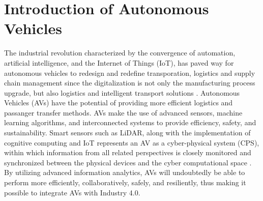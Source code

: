 \section{Introduction of Autonomous Vehicles}

The industrial revolution characterized by the convergence of automation, artificial intelligence, and the Internet of Things (IoT), has paved way for autonomous vehicles to redesign and redefine transporation, logistics and supply chain management since the digitalization is not only the manufacturing process upgrade, but also logistics and intelligent transport solutions \cite{ref1}. Autonomous Vehicles (AVs) have the potential of providing more efficient logistics and passanger transfer methods. AVs make the use of advanced sensors, machine learning algorithms, and interconnected systems to provide efficiency, safety, and sustainability. Smart sensors such as LiDAR, along with the implementation of cognitive computing and IoT represents an AV as a cyber-physical system (CPS), within which information from all related perspectives is closely monitored and synchronized between the physical devices and the cyber computational space \cite{ref1}. By utilizing advanced information analytics, AVs will undoubtedly be able to perform more efficiently, collaboratively, safely, and resiliently, thus making it possible to integrate AVs with Industry 4.0. 